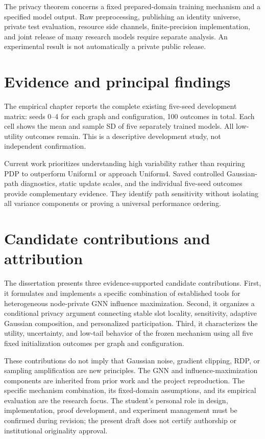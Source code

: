 The privacy theorem concerns a fixed prepared-domain training mechanism and a specified model output. Raw preprocessing, publishing an identity universe, private test evaluation, resource side channels, finite-precision implementation, and joint release of many research models require separate analysis. An experimental result is not automatically a private public release.

\section{Evidence and principal findings}
The empirical chapter reports the complete existing five-seed development matrix: seeds 0--4 for each graph and configuration, 100 outcomes in total. Each cell shows the mean and sample SD of five separately trained models. All low-utility outcomes remain. This is a descriptive development study, not independent confirmation.

Current work prioritizes understanding high variability rather than requiring PDP to outperform Uniform1 or approach Uniform4. Saved controlled Gaussian-path diagnostics, static update scales, and the individual five-seed outcomes provide complementary evidence. They identify path sensitivity without isolating all variance components or proving a universal performance ordering.

\section{Candidate contributions and attribution}
The dissertation presents three evidence-supported candidate contributions. First, it formulates and implements a specific combination of established tools for heterogeneous node-private GNN influence maximization. Second, it organizes a conditional privacy argument connecting stable slot locality, sensitivity, adaptive Gaussian composition, and personalized participation. Third, it characterizes the utility, uncertainty, and low-tail behavior of the frozen mechanism using all five fixed initialization outcomes per graph and configuration.

These contributions do not imply that Gaussian noise, gradient clipping, RDP, or sampling amplification are new principles. The GNN and influence-maximization components are inherited from prior work and the project reproduction. The specific mechanism combination, its fixed-domain assumptions, and its empirical evaluation are the research focus. The student's personal role in design, implementation, proof development, and experiment management must be confirmed during revision; the present draft does not certify authorship or institutional originality approval.


